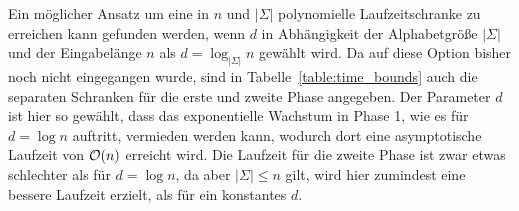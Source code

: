 Ein möglicher Ansatz um eine in \(n\) und \(|\Sigma|\) polynomielle Laufzeitschranke zu erreichen kann gefunden werden, wenn \(d\) in Abhängigkeit der Alphabetgröße \(|\Sigma|\) und der Eingabelänge \(n\) als \(d = \log_{|\Sigma|} n\) gewählt wird. Da auf diese Option bisher noch nicht eingegangen wurde, sind in Tabelle~\ref{table:time_bounds} auch die separaten Schranken für die erste und zweite Phase angegeben. Der Parameter \(d\) ist hier so gewählt, dass das exponentielle Wachstum in Phase 1, wie es für \(d = \log n\) auftritt, vermieden werden kann, wodurch dort eine asymptotische Laufzeit von \(\mathcal{O}(n)\) erreicht wird. Die Laufzeit für die zweite Phase ist zwar etwas schlechter als für \(d = \log n\), da aber \(|\Sigma| \leq n\) gilt, wird hier zumindest eine bessere Laufzeit erzielt, als für ein konstantes \(d\).
